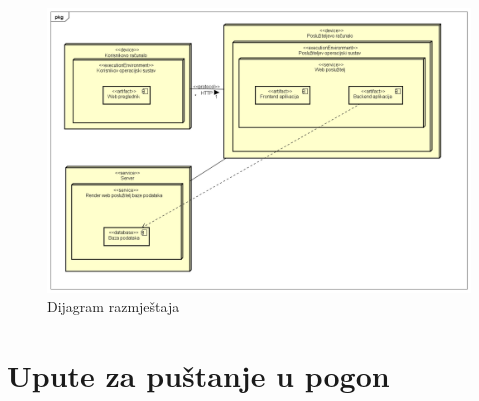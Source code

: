 			\begin{figure}[H]
				\centering
				\includegraphics[width=1\textwidth]{slike/dijagrami/Dijagram razmjestaja.png}
				\caption{Dijagram razmještaja}
				\label{fig:enter-label}
			\end{figure}	

			\eject 
		
		\section{Upute za puštanje u pogon}
		
		
			
			
			
			
			\eject 